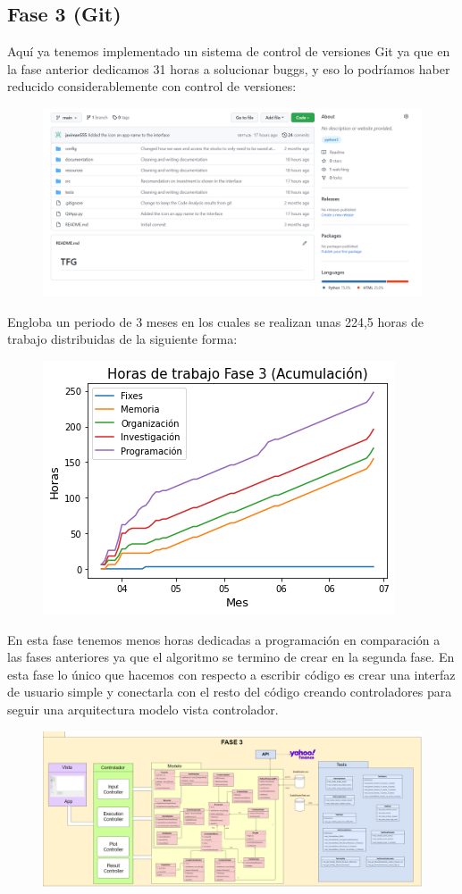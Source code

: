 \documentclass[12pt,a4paper]{article}
\begin{document}
	\subsection{Fase 3 (Git)}
Aquí ya tenemos implementado un sistema de control de versiones Git ya que en la fase anterior dedicamos 31 horas a solucionar buggs, y eso lo podríamos haber reducido considerablemente con control de versiones:\\
\begin{figure}[H]
\centering
  \centering
  \includegraphics[width=1\linewidth]{github}
\label{fig:subrgrafo}
\end{figure}
	Engloba un periodo de 3 meses en los cuales se realizan unas 224,5 horas de trabajo distribuidas de la siguiente forma:\\
\begin{figure}[H]
\centering
  \centering
  \includegraphics[width=0.5\linewidth]{tiempo fase 3}
\label{fig:subrgrafo}
\end{figure}
	En esta fase tenemos menos horas dedicadas a programación en comparación a las fases anteriores ya que el algoritmo se termino de crear en la segunda fase. En esta fase lo único que hacemos con respecto a escribir código es crear una interfaz de usuario simple y conectarla con el resto del código creando controladores para seguir una arquitectura modelo vista controlador.
\begin{figure}[H]
\centering
  \centering
  \includegraphics[width=1\linewidth]{fase 3}
\label{fig:subrgrafo}
\end{figure}
\end{document}
